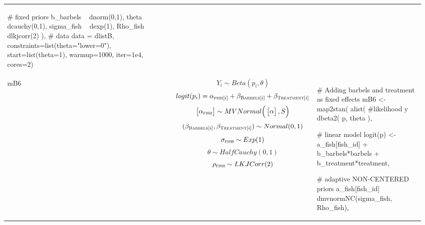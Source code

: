 \begin{longtable}{p{} |p{} |p{} }
{\begin{mylist}
    # fixed priors
    b_barbels ~ dnorm(0,1),
    theta ~ dcauchy(0,1),
    sigma_fish ~ dexp(1),
    Rho_fish ~ dlkjcorr(2)
  ),
  # data
  data = dlistB,
  constraints=list(theta="lower=0"),
  start=list(theta=1), warmup=1000, iter=1e4, cores=2) \end{mylist}}
\\ %
mB6& %
$$ Y_i \sim Beta(p_i, \theta) $$
\small $$ logit(p_i) =  \alpha_{\textsc{fish}[i]} + \beta_{\textsc{Barbels}[i]} + \beta_{\textsc{Treatment}[i]}$$
$$
\begin{bmatrix}
\alpha_{\textsc{fish}} \\
\end{bmatrix} \sim MVNormal \Big(
\begin{bmatrix}
\alpha \\
\end{bmatrix}, S \Big)
$$
$$ (\beta_{\textsc{Barbels}[i]}, \beta_{\textsc{Treatment}[i]})  \sim Normal(0,1) $$
$$ \sigma_{\textsc{fish}} \sim Exp(1) $$
$$ \theta \sim HalfCauchy(0, 1) $$
$$ \rho_{\textsc{fish}} \sim LKJCorr(2) $$
&
{\begin{mylist} %

#  Adding barbels and treatment as fixed effects
mB6 <- map2stan(
  alist(
    #likelihood
    y ~ dbeta2( p, theta ),
    
    # linear model
    logit(p) <- a_fish[fish_id] + b_barbels*barbels + 
    b_treatment*treatment,
    
    # adaptive NON-CENTERED priors 
    a_fish[fish_id] ~ dmvnormNC(sigma_fish, Rho_fish),
    

\end{mylist}}
\end{longtable}
